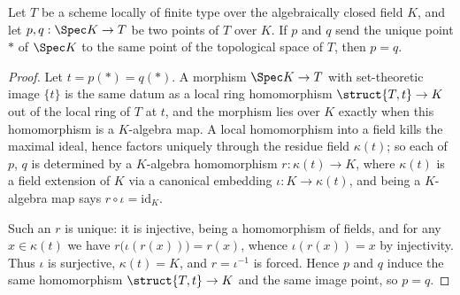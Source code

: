 \begin{lemma}
  \label{lem:point_ext}
  \leanok
  Let \(T\) be a scheme locally of finite type over the algebraically closed field \(K\), and
  let \(p, q : \Spec K \to T\) be two points of \(T\) over \(K\). If \(p\) and \(q\) send the
  unique point \(*\) of \(\Spec K\) to the same point of the topological space of \(T\), then
  \(p = q\).
\end{lemma}
\begin{proof}
  \leanok
  Let \(t = p(*) = q(*)\). A morphism \(\Spec K \to T\) with set-theoretic image \(\{t\}\) is
  the same datum as a local ring homomorphism \(\struct{T,t} \to K\) out of the local ring of
  \(T\) at \(t\), and the morphism lies over \(K\) exactly when this homomorphism is a
  \(K\)-algebra map. A local homomorphism into a field kills the maximal ideal, hence factors
  uniquely through the residue field \(\kappa(t)\); so each of \(p\), \(q\) is determined by
  a \(K\)-algebra homomorphism \(r : \kappa(t) \to K\), where \(\kappa(t)\) is a field
  extension of \(K\) via a canonical embedding \(\iota : K \to \kappa(t)\), and being a
  \(K\)-algebra map says \(r \circ \iota = \mathrm{id}_K\).

  Such an \(r\) is unique: it is injective, being a homomorphism of fields, and for any
  \(x \in \kappa(t)\) we have \(r\bigl(\iota(r(x))\bigr) = r(x)\), whence
  \(\iota(r(x)) = x\) by injectivity. Thus \(\iota\) is surjective, \(\kappa(t) = K\), and
  \(r = \iota^{-1}\) is forced. Hence \(p\) and \(q\) induce the same homomorphism
  \(\struct{T,t} \to K\) and the same image point, so \(p = q\).
\end{proof}

